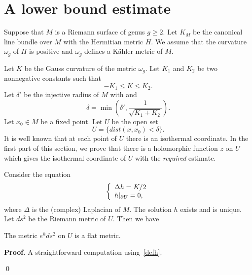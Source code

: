 \section{A lower bound estimate}
Suppose that $M$ is a Riemann surface of genus $g\geq 2$.
Let $K_M$ be the canonical line  bundle over $M$ with the Hermitian
metric $H$. We assume that the curvature $\omega_g$ of $H$ is positive
and $\omega_g$ defines a K\"ahler metric of $M$.

 Let $K$ be
the Gauss curvature of the metric $\omega_g$. Let $K_1$ and $K_2$ be two
nonnegative
constants such that
\begin{equation}\label{kbd}
-K_1\leq K\leq K_2.
\end{equation}
Let $\delta'$ be the injective radius of $M$ with  and
\begin{equation}\label{delta}
\delta=\min(\delta',\frac{1}{\sqrt{K_1+K_2}}).
\end{equation}
 Let $x_0\in M$ be a
fixed
point. Let $U$ be the open set 
\[
U=\{dist(x,x_0)<\delta\}. 
\]
It is well known that at each point of $U$ there is an isothermal
coordinate. 
In the first part of this section,
we prove that there is a holomorphic
function $z$ on $U$ which gives the isothermal coordinate of $U$ with 
the \textsl{required} estimate.

Consider the equation
\begin{equation}\label{defh}
\left\{
\begin{array}{l}
\Delta h=K/2\\
h|_{\partial U}=0,
\end{array}
\right.
\end{equation}
where $\Delta$ is the (complex) Laplacian of $M$. The solution $h$ exists
and is
unique.
Let $ds^2$ be the Riemann metric of $U$. Then we have

\begin{lemma}\label{lem21}
The metric $e^h ds^2$ on $U$ is a flat metric.
\end{lemma}

{\bf Proof.} A straightforward computation using~\eqref{defh}.


\qed

